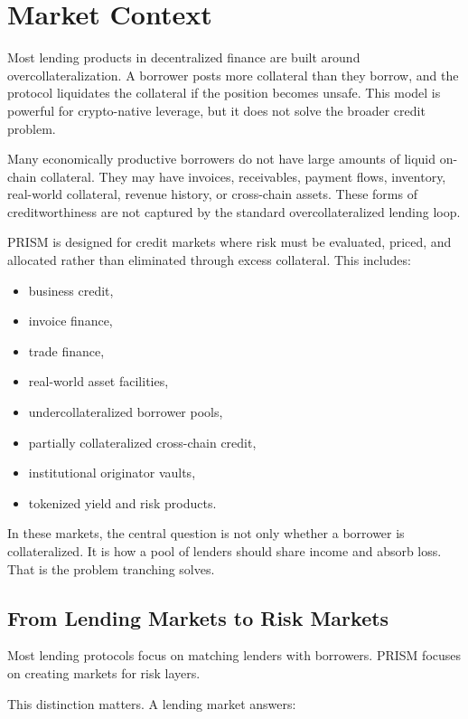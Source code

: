 \documentclass[11pt]{article}
\begin{document}
\section{Market Context}

Most lending products in decentralized finance are built around
overcollateralization. A borrower posts more collateral than they borrow, and the
protocol liquidates the collateral if the position becomes unsafe. This model is
powerful for crypto-native leverage, but it does not solve the broader credit
problem.

Many economically productive borrowers do not have large amounts of liquid
on-chain collateral. They may have invoices, receivables, payment flows,
inventory, real-world collateral, revenue history, or cross-chain assets. These
forms of creditworthiness are not captured by the standard overcollateralized
lending loop.

PRISM is designed for credit markets where risk must be evaluated, priced, and
allocated rather than eliminated through excess collateral. This includes:

\begin{itemize}
  \item business credit,
  \item invoice finance,
  \item trade finance,
  \item real-world asset facilities,
  \item undercollateralized borrower pools,
  \item partially collateralized cross-chain credit,
  \item institutional originator vaults,
  \item tokenized yield and risk products.
\end{itemize}

In these markets, the central question is not only whether a borrower is
collateralized. It is how a pool of lenders should share income and absorb loss.
That is the problem tranching solves.

\subsection{From Lending Markets to Risk Markets}

Most lending protocols focus on matching lenders with borrowers. PRISM focuses
on creating markets for risk layers.

This distinction matters. A lending market answers:
\end{document}
